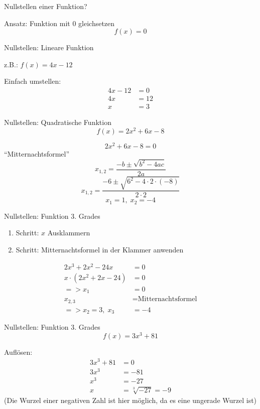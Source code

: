 \documentclass[paper=a6,landscape,ngerman,twoside=true,fontsize=12pt]{scrartcl}
\begin{document}
\begin{frage}
	Nullstellen einer Funktion?
	
\end{frage}
\begin{antwort}
	Ansatz: Funktion mit 0 gleichsetzen
	\[
	f(x)=0
	\]
\end{antwort}
\begin{frage}
	Nullstellen: Lineare Funktion
		
	z.B.: $f(x)=4x-12$
		
\end{frage}
\begin{antwort}
	Einfach umstellen:
	\begin{align*}
	4x-12&=0 \\
	4x&=12 \\
	x&=3
	\end{align*}
\end{antwort}
\begin{frage}
	Nullstellen: Quadratische Funktion
	\[
		f(x)=2x^2+6x-8
	\]
\end{frage}
\begin{antwort}
		\[
		2x^2+6x-8=0
		\]
	"`Mitternachtsformel"'
	\[
		x_{1,2}=\frac{-b\pm\sqrt{b^2-4ac}}{2a}
	\]
	\[
	x_{1,2}=\frac{-6\pm\sqrt{6^2-4\cdot2\cdot(-8)}}{2\cdot2 }
	\]
	\[
	x_{1}=1,\;x_{2}=-4
	\]

\end{antwort}
\begin{frage}
	Nullstellen: Funktion 3. Grades
\end{frage}
\begin{antwort}
	\normalsize\begin{enumerate}
		\item Schritt: $x$ Ausklammern
		\item Schritt: Mitternachtsformel in der Klammer anwenden
	\end{enumerate}
	\normalsize\begin{align*}
		2x^3+2x^2-24x&=0\\
		x\cdot(2x^2+2x-24)&=0\\
		=>	x_{1}&= 0\\
		x_{2,3}&= \text{Mitternachtsformel}\\
		=>	x_{2}=3,\;x_{3}&=-4
	\end{align*}	
\end{antwort}
\begin{frage}
	Nullstellen: Funktion 3. Grades
	\[
	f(x)=3x^3+81
	\]
\end{frage}
\begin{antwort}
	Auflösen:
	\begin{align*}
		3x^3+81&=0 \\
		3x^3&=-81 \\
		x^3&=-27 \\
		x&=\sqrt[3]{-27}=-9
	\end{align*}
	\normalsize
	(Die Wurzel einer negativen Zahl ist hier möglich, da es eine ungerade Wurzel ist)
\end{antwort}
\end{document}
